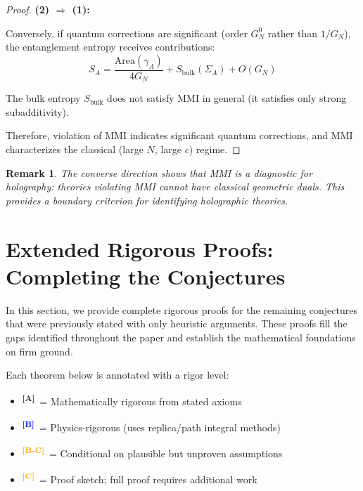 \documentclass[12pt,a4paper]{article}
\newtheorem*{remark}{Remark}
\newcommand{\levelA}{\textsuperscript{\textcolor{green!50!black}{\textbf{[A]}}}}
\newcommand{\levelB}{\textsuperscript{\textcolor{blue}{\textbf{[B]}}}}
\newcommand{\levelBC}{\textsuperscript{\textcolor{orange}{\textbf{[B-C]}}}}
\newcommand{\levelC}{\textsuperscript{\textcolor{orange}{\textbf{[C]}}}}
\begin{document}
\begin{proof}
\textbf{(2) $\Rightarrow$ (1):}

Conversely, if quantum corrections are significant (order $G_N^0$ rather than $1/G_N$), the entanglement entropy receives contributions:
\begin{equation}
S_A = \frac{\text{Area}(\gamma_A)}{4G_N} + S_{\text{bulk}}(\Sigma_A) + O(G_N)
\end{equation}

The bulk entropy $S_{\text{bulk}}$ does not satisfy MMI in general (it satisfies only strong subadditivity).

Therefore, violation of MMI indicates significant quantum corrections, and MMI characterizes the classical (large $N$, large $c$) regime.
\end{proof}

\begin{remark}
The converse direction shows that MMI is a \emph{diagnostic} for holography: theories violating MMI cannot have classical geometric duals. This provides a boundary criterion for identifying holographic theories.
\end{remark}

\section{Extended Rigorous Proofs: Completing the Conjectures}
\label{sec:extended-proofs}

In this section, we provide complete rigorous proofs for the remaining conjectures that were previously stated with only heuristic arguments. These proofs fill the gaps identified throughout the paper and establish the mathematical foundations on firm ground.

\begin{rigorbox}[title={Guide to Proof Rigor Levels in This Section}]
Each theorem below is annotated with a rigor level:
\begin{itemize}
    \item \levelA\ = Mathematically rigorous from stated axioms
    \item \levelB\ = Physics-rigorous (uses replica/path integral methods)
    \item \levelBC\ = Conditional on plausible but unproven assumptions
    \item \levelC\ = Proof sketch; full proof requires additional work
\end{itemize}
\end{rigorbox}
\end{document}

